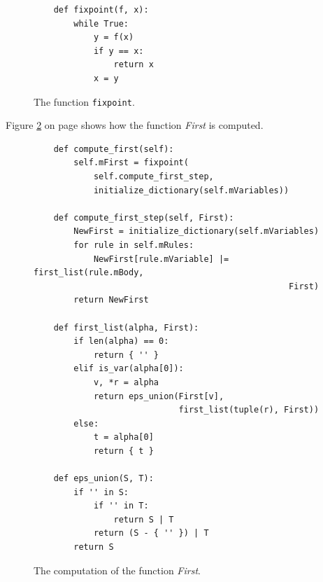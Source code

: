 \begin{figure}[!ht]
\centering
\begin{verbatim}
    def fixpoint(f, x):
        while True:
            y = f(x)
            if y == x:
                return x
            x = y
\end{verbatim}
\vspace*{-0.3cm}
\caption{The function \texttt{fixpoint}.}
\label{fig:04-SLR-Table-Generator.ipynb:fixpoint}
\end{figure}

\noindent
Figure \ref{fig:04-SLR-Table-Generator.ipynb:compute_first} on page
\pageref{fig:04-SLR-Table-Generator.ipynb:compute_first} shows how the function \textsl{First} is computed.

\begin{figure}[!ht]
\centering
\begin{verbatim}
    def compute_first(self):
        self.mFirst = fixpoint(
            self.compute_first_step,
            initialize_dictionary(self.mVariables))

    def compute_first_step(self, First):
        NewFirst = initialize_dictionary(self.mVariables)
        for rule in self.mRules:
            NewFirst[rule.mVariable] |= first_list(rule.mBody,
                                                   First)
        return NewFirst

    def first_list(alpha, First):
        if len(alpha) == 0:
            return { '' }
        elif is_var(alpha[0]):
            v, *r = alpha
            return eps_union(First[v],
                             first_list(tuple(r), First))
        else:
            t = alpha[0]
            return { t }

    def eps_union(S, T):
        if '' in S:
            if '' in T:
                return S | T
            return (S - { '' }) | T
        return S
\end{verbatim}
\vspace*{-0.3cm}
\caption{The computation of the function \textsl{First}.}
\label{fig:04-SLR-Table-Generator.ipynb:compute_first}
\end{figure}

